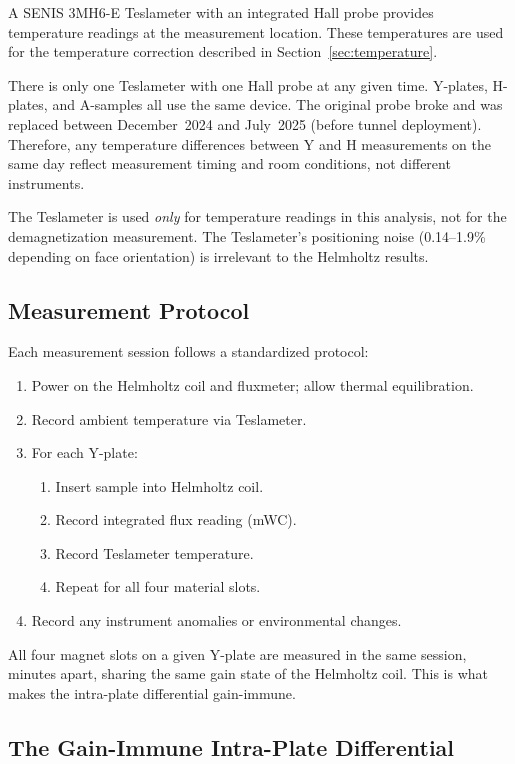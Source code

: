 \documentclass[11pt,letterpaper]{article}
\begin{document}
A SENIS 3MH6-E Teslameter with an integrated Hall probe provides temperature
readings at the measurement location. These temperatures are used for the
temperature correction described in Section~\ref{sec:temperature}.

There is only one Teslameter with one
Hall probe at any given time. Y-plates, H-plates, and A-samples all use the
same device. The original probe broke and was replaced between
December~2024 and July~2025 (before tunnel deployment). Therefore, any
temperature differences between Y and H measurements on the same day reflect
measurement timing and room conditions, not different instruments.

The Teslameter is used \emph{only} for temperature readings in this analysis,
not for the demagnetization measurement. The Teslameter's positioning noise
(0.14--1.9\% depending on face orientation) is irrelevant to the Helmholtz
results.

\subsection{Measurement Protocol}

Each measurement session follows a standardized protocol:
\begin{enumerate}
    \item Power on the Helmholtz coil and fluxmeter; allow thermal equilibration.
    \item Record ambient temperature via Teslameter.
    \item For each Y-plate:
    \begin{enumerate}
        \item Insert sample into Helmholtz coil.
        \item Record integrated flux reading (mWC).
        \item Record Teslameter temperature.
        \item Repeat for all four material slots.
    \end{enumerate}
    \item Record any instrument anomalies or environmental changes.
\end{enumerate}

All four magnet slots on a given Y-plate are measured
in the same session, minutes apart, sharing the same gain state of the
Helmholtz coil. This is what makes the intra-plate differential gain-immune.

\subsection{The Gain-Immune Intra-Plate Differential}
\label{sec:gain_immune}
\end{document}
